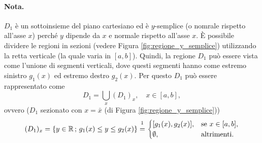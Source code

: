 \paragraph{Nota.} $D_1$ è un sottoinsieme del piano cartesiano ed è $y$-semplice (o nomrale rispetto all'asse $x$) perché $y$ dipende da $x$ e normale rispetto all'asse $x$. È possibile dividere le regioni in sezioni (vedere Figura \ref{fig:regione_y_semplice}) utilizzando la retta verticale (la quale varia in $[a,b]$). Quindi, la regione $D_1$ può essere vista come l'unione di segmenti verticali, dove questi segmenti hanno come estremo sinistro $g_1(x)$ ed estremo destro $g_2(x)$. Per questo $D_1$ può essere rappresentato come
\begin{equation*}
	D_1 = \underset{x}{\bigcup} (D_1)_x,\quad x\in[a,b],
\end{equation*} 
ovvero ($D_1$ sezionato con $x=\bar x$ (di Figura \ref{fig:regione_y_semplice}))
\begin{equation*}
	(D_1)_x = \{y\in\mathbb{R}\, ;\, g_1(x) \leq y \leq g_2(x)\} \overset{\footnotemark}{=} 
	\begin{cases}
		[g_1(x), g_2(x)],	&\text{se } x\in[a,b],\\
		\emptyset,				&\text{altrimenti}.
	\end{cases}
\end{equation*}


